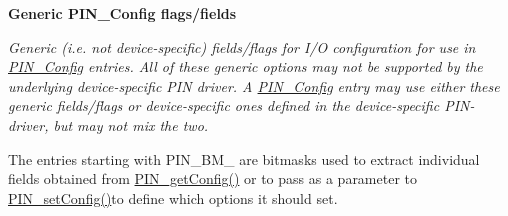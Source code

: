 \begin{Indent}{\bf Generic P\-I\-N\-\_\-\-Config flags/fields}\par
{\em \label{_p_i_n_8h_PIN_GENERIC_FLAGS}%
\hypertarget{_p_i_n_8h_PIN_GENERIC_FLAGS}{}%
 Generic (i.\-e. not device-\/specific) fields/flags for I/\-O configuration for use in \hyperlink{_p_i_n_8h_ae427b7d2925f9b0f3145e455cfdb5841}{P\-I\-N\-\_\-\-Config} entries. All of these generic options may not be supported by the underlying device-\/specific P\-I\-N driver. A \hyperlink{_p_i_n_8h_ae427b7d2925f9b0f3145e455cfdb5841}{P\-I\-N\-\_\-\-Config} entry may use either these generic fields/flags or device-\/specific ones defined in the device-\/specific P\-I\-N-\/driver, but may not mix the two.

The entries starting with P\-I\-N\-\_\-\-B\-M\-\_\- are bitmasks used to extract individual fields obtained from \hyperlink{_p_i_n_8h_aed24cb96de8fa957e9f7c05dd239f2f9}{P\-I\-N\-\_\-get\-Config()} or to pass as a parameter to \hyperlink{_p_i_n_8h_a4b9fbd1a86e63d2f14f679b87f17c857}{P\-I\-N\-\_\-set\-Config()}to define which options it should set.

}
\end{Indent}
